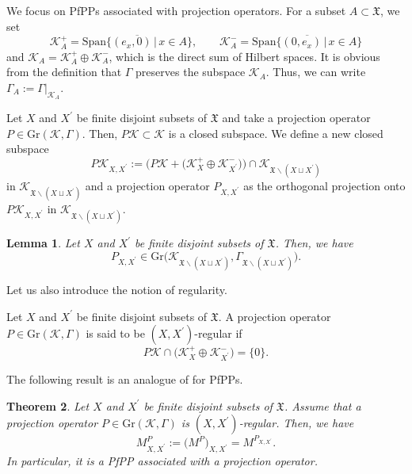 \documentclass[11pt]{article}
\numberwithin{equation}{section}
\numberwithin{equation}{section}
\newtheorem{Theorem}{Theorem}[section]
\newtheorem{Lemma}[Theorem]{Lemma}
\newcommand{\pr}[1]{#1^{\prime}}
\newcommand{\mfrak}[1]{\mathfrak{#1}}
\newcommand{\mcal}[1]{\mathcal{#1}}
\newcommand{\mrm}[1]{\mathrm{#1}}
\begin{document}
We focus on PfPPs associated with projection operators.
For a subset $A\subset\mfrak{X}$, we set
\begin{equation*}
	\mcal{K}_{A}^{+}=\overline{\mrm{Span}\{(e_{x},0)\,|\,x\in A\}},\qquad \mcal{K}^{-}_{A}=\overline{\mrm{Span}\{(0,e_{x})\,|\,x\in A\}}
\end{equation*}
and $\mcal{K}_{A}=\mcal{K}_{A}^{+}\oplus\mcal{K}_{A}^{-}$, which is the direct sum of Hilbert spaces.
It is obvious from the definition that $\Gamma$ preserves the subspace $\mcal{K}_{A}$. Thus, we can write $\Gamma_{A}:=\Gamma|_{\mcal{K}_{A}}$.

Let $X$ and $\pr{X}$ be finite disjoint subsets of $\mfrak{X}$ and take a projection operator $P\in \mrm{Gr}(\mcal{K},\Gamma)$.
Then, $P\mcal{K}\subset\mcal{K}$ is a closed subspace. We define a new closed subspace
\begin{equation*}
	P\mcal{K}_{X,\pr{X}}:=\big(P\mcal{K}+\big(\mcal{K}_{X}^{+}\oplus \mcal{K}^{-}_{\pr{X}}\big)\big)\cap \mcal{K}_{\mfrak{X}\backslash (X\sqcup\pr{X})}
\end{equation*}
in $\mcal{K}_{\mfrak{X}\backslash (X\sqcup\pr{X})}$ and a projection operator $P_{X,\pr{X}}$ as the orthogonal projection onto $P\mcal{K}_{X,\pr{X}}$ in $\mcal{K}_{\mfrak{X}\backslash (X\sqcup\pr{X})}$.

\begin{Lemma}\label{lem:conditional_projection}
Let $X$ and $\pr{X}$ be finite disjoint subsets of $\mfrak{X}$. Then, we have
\begin{equation*}
	P_{X,\pr{X}}\in\mrm{Gr}\big(\mcal{K}_{\mfrak{X}\backslash(X\sqcup\pr{X})},\Gamma_{\mfrak{X}\backslash (X\sqcup\pr{X})}\big).
\end{equation*}
\end{Lemma}

 Let us also introduce the notion of regularity.
 \begin{Definition} Let $X$ and $\pr{X}$ be finite disjoint subsets of $\mfrak{X}$.
 A projection operator $P\in \mrm{Gr}(\mcal{K},\Gamma)$ is said to be $(X,\pr{X})$-regular if
 \begin{equation*}
 	P\mcal{K}\cap \big(\mcal{K}_{X}^{+}\oplus \mcal{K}_{\pr{X}}^{-}\big)=\{0\}.
 \end{equation*}
 \end{Definition}

 The following result is an analogue of \cite[Proposition~6.13]{Olshanski2020} for PfPPs.
 \begin{Theorem}\label{thm:conditional_projection}
 Let $X$ and $\pr{X}$ be finite disjoint subsets of $\mfrak{X}$.
 Assume that a projection operator $P\in\mrm{Gr}(\mcal{K},\Gamma)$ is $(X,\pr{X})$-regular.
 Then, we have
 \begin{equation*}
 	M^{P}_{X,\pr{X}}:=\big(M^{P}\big)_{X,\pr{X}}=M^{P_{X,\pr{X}}}.
 \end{equation*}
 In particular, it is a PfPP associated with a projection operator.
 \end{Theorem}
\end{document}
